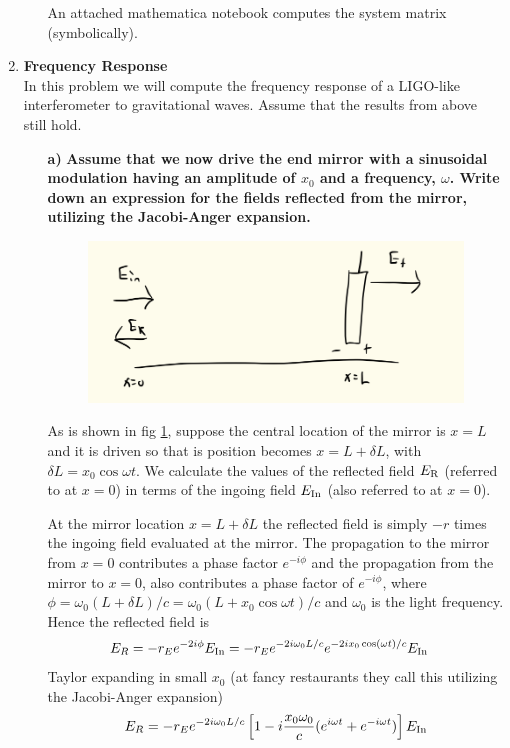 \documentclass[11pt]{article}
\begin{document}
\begin{enumerate}
\begin{itemize}
An attached mathematica notebook computes the system matrix (symbolically).

\end{itemize}

\item
{\bf Frequency Response} \\
In this problem we will compute the frequency response of a LIGO-like interferometer to gravitational waves. Assume that the results from above still hold.
\begin{itemize}

\item[\bf a)] {\bf Assume that we now drive the end mirror with a sinusoidal modulation having an amplitude of $x_0$ and a frequency, $\omega$. Write down an expression for the fields reflected from the mirror, utilizing the Jacobi-Anger expansion.}

\begin{figure}[t]
\includegraphics[width =1\columnwidth]{Driven}
\caption{
}
\label{fig:Driven}
\end{figure}

As is shown in fig \ref{fig:Driven}, suppose the central location of the mirror is $x=L$ and it is driven so that is position becomes $x=L+\delta L$, with $\delta L =x_0 \cos \omega t$. We calculate the values of the reflected field $E_{\rm R}$ (referred to at $x=0$) in terms of the ingoing field $E_{\rm In}$ (also referred to at $x=0$).

At the mirror location $x=L+\delta L$ the reflected field is simply $-r$ times the ingoing field evaluated at the mirror. The propagation to the mirror from $x=0$ contributes a phase factor $e^{-i\phi}$ and the propagation from the mirror to $x=0$, also contributes a phase factor of $e^{-i\phi}$, where $\phi=\omega_0(L+\delta L)/c=\omega_0(L+x_0\cos\omega t)/c$ and $\omega_0$ is the light frequency. Hence the reflected field is
\begin{align}
E_R&=-r_E e^{-2i\phi}E_{\rm In} 
=-r_E e^{-2i\omega_0L/c}e^{-2i x_0 \cos (\omega t)/c} E_{\rm In}
\end{align}
Taylor expanding in small $x_0$ (at fancy restaurants they call this utilizing the Jacobi-Anger expansion)
\begin{align}
E_R=-r_E e^{-2i\omega_0 L/c}\left[1-i\frac{x_0\omega_0}{c}(e^{i\omega t}+e^{-i\omega t})\right]E_{\rm In} \label{eq:side}
\end{align}


\end{itemize}
\end{enumerate}
\end{document}

